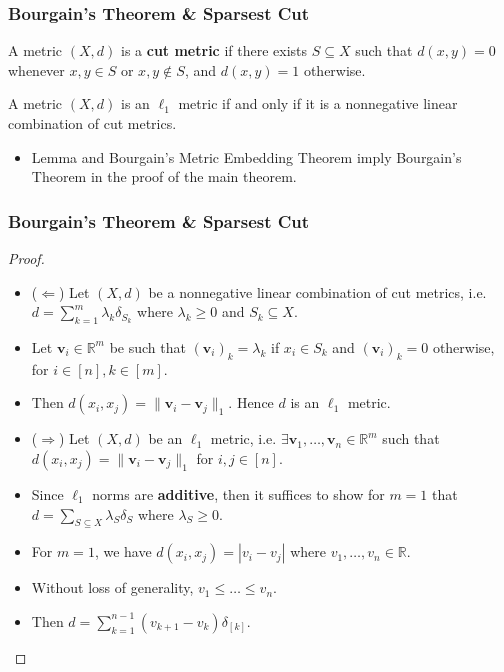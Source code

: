 \documentclass{beamer}
\newcommand{\RR}{\mathbb{R}}
\begin{document}
    \begin{frame}
        \frametitle{Bourgain's Theorem \& {\sc Sparsest Cut}}
    
        \begin{definition}
            A metric $(X, d)$ is a {\bf cut metric} if there exists $S \subseteq X$ such that $d(x, y) = 0$ whenever $x, y \in S$ or $x, y \not \in S$, and $d(x, y) = 1$ otherwise.
        \end{definition}

        \pause

        \begin{lemma}
            A metric $(X, d)$ is an $\ell_1$ metric if and only if it is a nonnegative linear combination of cut metrics.
        \end{lemma}

        \pause

        \begin{itemize}
            \item Lemma and Bourgain's Metric Embedding Theorem imply Bourgain's Theorem in the proof of the main theorem.
        \end{itemize}
    \end{frame}

    \begin{frame}
        \frametitle{Bourgain's Theorem \& {\sc Sparsest Cut}}
    
        \begin{proof}
            \begin{itemize}
                \item ($\Longleftarrow$) Let $(X, d)$ be a nonnegative linear combination of cut metrics, i.e. $d = \sum_{k = 1}^m \lambda_k \delta_{S_k}$ where $\lambda_k \geq 0$ and $S_k \subseteq X$. \pause
                \item Let $\mathbf v_i \in \RR^m$ be such that $(\mathbf v_i)_k = \lambda_k$ if $x_i \in S_k$ and $(\mathbf v_i)_k = 0$ otherwise, for $i \in [n], k \in [m]$. \pause
                \item Then $d(x_i, x_j) = \lVert \mathbf v_i - \mathbf v_j \rVert_1$. Hence $d$ is an $\ell_1$ metric. \pause
                \item ($\Longrightarrow$) Let $(X, d)$ be an $\ell_1$ metric, i.e. $\exists \mathbf v_1, \ldots, \mathbf v_n \in \RR^m$ such that $d(x_i, x_j) = \lVert \mathbf v_i - \mathbf v_j \rVert_1$ for $i, j \in [n]$. \pause
                \item Since $\ell_1$ norms are {\bf additive}, then it suffices to show for $m = 1$ that $d = \sum_{S \subseteq X} \lambda_S \delta_S$ where $\lambda_S \geq 0$. \pause
                \item For $m = 1$, we have $d(x_i, x_j) = |v_i - v_j|$ where $v_1, \ldots, v_n \in \RR$. \pause
                \item Without loss of generality, $v_1 \leq \ldots \leq v_n$. \pause
                \item Then $d = \sum_{k = 1}^{n - 1} (v_{k + 1} - v_k) \delta_{[k]}$.
            \end{itemize}
        \end{proof}
    \end{frame}
\end{document}
